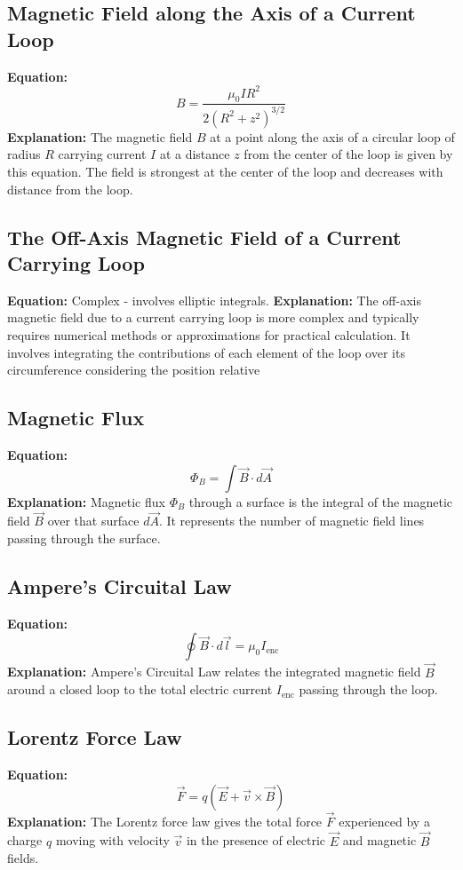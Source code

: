 \documentclass{article}
\begin{document}
\subsection*{Magnetic Field along the Axis of a Current Loop}
\textbf{Equation:} 
\[ B = \frac{\mu_0 I R^2}{2(R^2 + z^2)^{3/2}} \]
\textbf{Explanation:} 
The magnetic field \(B\) at a point along the axis of a circular loop of radius \(R\) carrying current \(I\) at a distance \(z\) from the center of the loop is given by this equation. The field is strongest at the center of the loop and decreases with distance from the loop.

\subsection*{The Off-Axis Magnetic Field of a Current Carrying Loop}
\textbf{Equation:} 
Complex - involves elliptic integrals.
\textbf{Explanation:} 
The off-axis magnetic field due to a current carrying loop is more complex and typically requires numerical methods or approximations for practical calculation. It involves integrating the contributions of each element of the loop over its circumference considering the position relative









\subsection*{Magnetic Flux}
\textbf{Equation:} 
\[ \Phi_B = \int \vec{B} \cdot d\vec{A} \]
\textbf{Explanation:} 
Magnetic flux \( \Phi_B \) through a surface is the integral of the magnetic field \( \vec{B} \) over that surface \( d\vec{A} \). It represents the number of magnetic field lines passing through the surface.

\subsection*{Ampere's Circuital Law}
\textbf{Equation:} 
\[ \oint \vec{B} \cdot d\vec{l} = \mu_0 I_{\text{enc}} \]
\textbf{Explanation:} 
Ampere's Circuital Law relates the integrated magnetic field \( \vec{B} \) around a closed loop to the total electric current \( I_{\text{enc}} \) passing through the loop.

\subsection*{Lorentz Force Law}
\textbf{Equation:} 
\[ \vec{F} = q(\vec{E} + \vec{v} \times \vec{B}) \]
\textbf{Explanation:} 
The Lorentz force law gives the total force \( \vec{F} \) experienced by a charge \( q \) moving with velocity \( \vec{v} \) in the presence of electric \( \vec{E} \) and magnetic \( \vec{B} \) fields.
\end{document}
